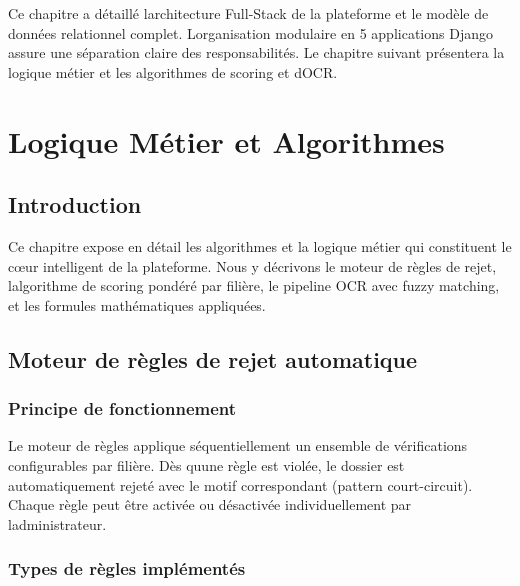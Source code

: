 Ce chapitre a détaillé l\textquotesingle architecture Full-Stack de la
plateforme et le modèle de données relationnel complet.
L\textquotesingle organisation modulaire en 5 applications Django assure
une séparation claire des responsabilités. Le chapitre suivant
présentera la logique métier et les algorithmes de scoring et
d\textquotesingle OCR.

\chapter{Logique Métier et
Algorithmes}

\section{Introduction}

Ce chapitre expose en détail les algorithmes et la logique métier qui
constituent le cœur intelligent de la plateforme. Nous y décrivons le
moteur de règles de rejet, l\textquotesingle algorithme de scoring
pondéré par filière, le pipeline OCR avec fuzzy matching, et les
formules mathématiques appliquées.

\section{Moteur de règles de rejet
automatique}

\subsection{Principe de
fonctionnement}

Le moteur de règles applique séquentiellement un ensemble de
vérifications configurables par filière. Dès qu\textquotesingle une
règle est violée, le dossier est automatiquement rejeté avec le motif
correspondant (pattern court-circuit). Chaque règle peut être activée ou
désactivée individuellement par l\textquotesingle administrateur.

\subsection{Types de règles
implémentés}

